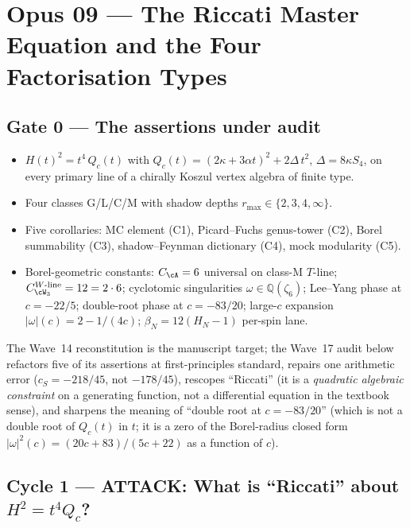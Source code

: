 
\section*{Opus 09 --- The Riccati Master Equation and the Four Factorisation Types}

\subsection*{Gate 0 --- The assertions under audit}

\begin{itemize}
\item $H(t)^2 = t^4\,Q_c(t)$ with $Q_c(t) = (2\kappa + 3\alpha t)^2 + 2\Delta\,t^2$,
  $\Delta = 8\kappa S_4$, on every primary line of a chirally Koszul
  vertex algebra of finite type.
\item Four classes G/L/C/M with shadow depths $r_{\max} \in \{2,3,4,\infty\}$.
\item Five corollaries: MC element (C1), Picard--Fuchs genus-tower (C2),
  Borel summability (C3), shadow--Feynman dictionary (C4), mock modularity
  (C5).
\item Borel-geometric constants: $C_\cA = 6$ universal on class-M $T$-line;
  $C^{W\text{-line}}_{\cW_3} = 12 = 2\cdot 6$; cyclotomic singularities
  $\omega \in \mathbb Q(\zeta_6)$; Lee--Yang phase at $c = -22/5$; double-root
  phase at $c = -83/20$; large-$c$ expansion $|\omega|(c) = 2 - 1/(4c)$;
  $\beta_N = 12(H_N - 1)$ per-spin lane.
\end{itemize}

The Wave~14 reconstitution is the manuscript target; the Wave~17 audit below
refactors five of its assertions at first-principles standard, repairs one
arithmetic error ($c_S = -218/45$, not $-178/45$), rescopes ``Riccati''
(it is a \emph{quadratic algebraic constraint} on a generating function, not
a differential equation in the textbook sense), and sharpens the meaning of
``double root at $c=-83/20$'' (which is not a double root of $Q_c(t)$ in
$t$; it is a zero of the Borel-radius closed form
$|\omega|^2(c) = (20c+83)/(5c+22)$ as a function of $c$).

\subsection*{Cycle 1 --- ATTACK: What is ``Riccati'' about $H^2 = t^4 Q_c$?}

